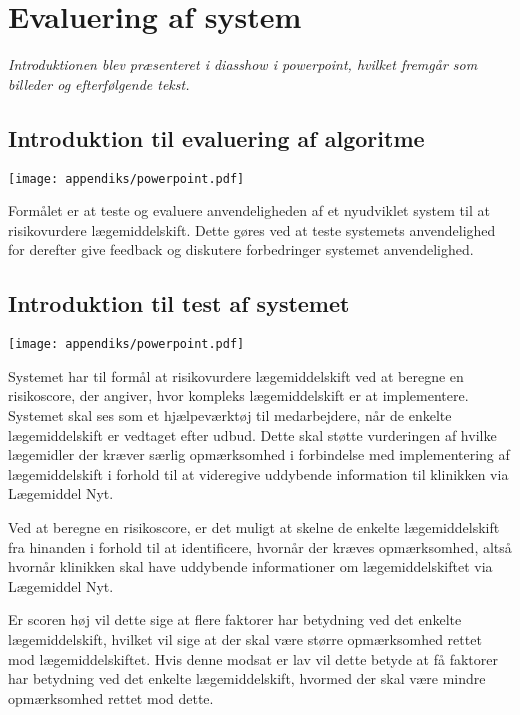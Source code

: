 \chapter{Evaluering af system} \vspace{-1cm} \label{App:Intro}
\textit{Introduktionen blev præsenteret i diasshow i powerpoint, hvilket fremgår som billeder og efterfølgende tekst.}

\section{Introduktion til evaluering af algoritme}  \vspace{-0.3cm}
 \texttt{[image: appendiks/powerpoint.pdf]} \\ \vspace{-3cm} 
  
Formålet er at teste og evaluere anvendeligheden af et nyudviklet system til at risikovurdere lægemiddelskift. Dette gøres ved at teste systemets anvendelighed for derefter give feedback og diskutere forbedringer systemet anvendelighed.

\section{Introduktion til test af systemet} \vspace{-0.3cm}
\texttt{[image: appendiks/powerpoint.pdf]} 

Systemet har til formål at risikovurdere lægemiddelskift ved at beregne en risikoscore, der angiver, hvor kompleks lægemiddelskift er at implementere. Systemet skal ses som et hjælpeværktøj til medarbejdere, når de enkelte lægemiddelskift er vedtaget efter udbud.  Dette skal støtte vurderingen af hvilke lægemidler der kræver særlig opmærksomhed i forbindelse med implementering af lægemiddelskift i forhold til at videregive uddybende information til klinikken via Lægemiddel Nyt. 

Ved at beregne en risikoscore, er det muligt at skelne de enkelte lægemiddelskift fra hinanden i forhold til at identificere, hvornår der kræves opmærksomhed, altså hvornår klinikken skal have uddybende informationer om lægemiddelskiftet via Lægemiddel Nyt.

Er scoren høj vil dette sige at flere faktorer har betydning ved det enkelte lægemiddelskift, hvilket vil sige at der skal være større opmærksomhed rettet mod lægemiddelskiftet. Hvis denne modsat er lav vil dette betyde at få faktorer har betydning ved det enkelte lægemiddelskift, hvormed der skal være mindre opmærksomhed rettet mod dette.

